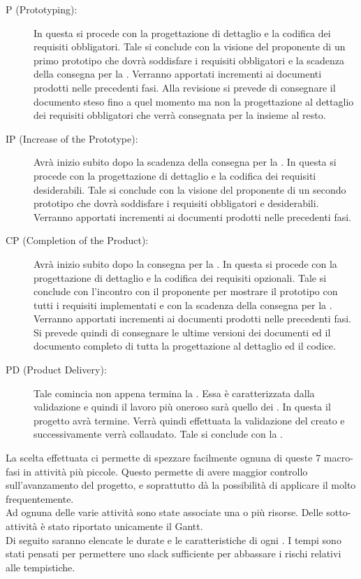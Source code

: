 \begin{description}
		\item[ P (Prototyping):] In questa  si procede con la progettazione di dettaglio e la codifica dei requisiti obbligatori. Tale  si conclude con la visione del proponente di un primo prototipo che dovrà soddisfare i requisiti obbligatori e la scadenza della consegna per la . Verranno apportati incrementi ai documenti prodotti nelle precedenti fasi. Alla revisione si prevede di consegnare il documento  steso fino a quel momento ma non la progettazione al dettaglio dei requisiti obbligatori che verrà consegnata per la  insieme al resto.
		\item[ IP (Increase of the Prototype):] Avrà inizio subito dopo la scadenza della consegna per la . In questa  si procede con la progettazione di dettaglio e la codifica dei requisiti desiderabili. Tale  si conclude con la visione del proponente di un secondo prototipo che dovrà soddisfare i requisiti obbligatori e desiderabili. Verranno apportati incrementi ai documenti prodotti nelle precedenti fasi.
		\item[ CP (Completion of the Product):] Avrà inizio subito dopo la consegna per la . In questa  si procede con la progettazione di dettaglio e la codifica dei requisiti opzionali. Tale  si conclude con l'incontro con il proponente per mostrare il prototipo con tutti i requisiti implementati e con la scadenza della consegna per la . Verranno apportati incrementi ai documenti prodotti nelle precedenti fasi. Si prevede quindi di consegnare le ultime versioni dei documenti ed il documento  completo di tutta la progettazione al dettaglio ed il codice.
		\item[ PD (Product Delivery):] Tale  comincia non appena termina la . Essa è caratterizzata dalla validazione e quindi il lavoro più oneroso sarà quello dei . In questa  il progetto avrà termine. Verrà quindi effettuata la validazione del  creato e successivamente verrà collaudato. Tale  si conclude con la .
	\end{description}
	La scelta effettuata ci permette di spezzare facilmente ognuna di queste 7 macro-fasi in attività più piccole. Questo permette di avere maggior controllo sull'avanzamento del progetto, e soprattutto dà la possibilità di applicare il  molto frequentemente.\\Ad ognuna delle varie attività sono state associate una o più risorse. Delle sotto-attività è stato riportato unicamente il Gantt.\\ 
	Di seguito saranno elencate le durate e le caratteristiche di ogni . I tempi sono stati pensati per permettere uno slack sufficiente per abbassare i rischi relativi alle tempistiche.
	
	
	
	
	
	
	
	
